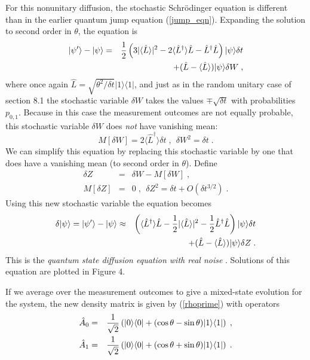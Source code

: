 \documentclass[12pt]{article}
\def\bra#1{{\langle #1 |}}
\def\ket#1{{| #1 \rangle}}
\def\expect#1{{\langle #1 \rangle}}
\def\A{{\hat A}}
\def\L{{\hat L}}
\def\Ldag{{\hat L^\dagger}}
\begin{document}
For this nonunitary diffusion, the stochastic Schr\"odinger equation
is different than in the earlier quantum jump equation (\ref{jump_eqn}).
Expanding the solution to second order in $\theta$, the equation is
\begin{eqnarray}
\ket{\psi'} - \ket\psi &=&
  {1\over2}\left(3|\expect{\L}|^2 - 2\expect{\Ldag}\L
  - \Ldag\L\right)\ket\psi \delta t \nonumber\\
&& + (\L - \expect{\L})\ket\psi \delta W \;,
\end{eqnarray}
where once again $\L = \sqrt{\theta^2/\delta t}\ket1\bra1$, and
just as in the random unitary case of section 8.1 the stochastic
variable $\delta W$ takes the values $\mp \sqrt{\delta t}$ with 
probabilities $p_{0,1}$.
Because in this case the measurement outcomes are not equally probable,
this stochastic variable $\delta W$ does {\it not} have vanishing mean:
\begin{equation}
M[\delta W] = 2\expect{\Ldag}\delta t \;, \ \ \delta W^2 = \delta t \;.
\end{equation}
We can simplify this equation by replacing this stochastic variable by
one that does have a vanishing mean (to second order in $\theta$).  Define
\begin{eqnarray}
\delta Z &=& \delta W - M[\delta W] \;, \nonumber\\
M[\delta Z] &=& 0 \;, \ \ \delta Z^2 = \delta t + O(\delta t^{3/2}) \;.
\end{eqnarray}
Using this new stochastic variable the equation becomes
\begin{eqnarray}
\delta\ket\psi = \ket{\psi'} - \ket\psi &\approx& 
  \left( \expect{\Ldag}\L - {1\over2}|\expect{\L}|^2
  - {1\over2}\Ldag\L\right)\ket\psi \delta t \nonumber\\
&& + (\L - \expect{\L})\ket\psi \delta Z \;.
\label{real_qsd}
\end{eqnarray}
This is the {\it quantum state diffusion equation with real noise}
\cite{Gisin1}.  Solutions of this equation are plotted in Figure 4.

If we average over the measurement outcomes to give a mixed-state
evolution for the system, the new density matrix is given by
(\ref{rhoprime}) with operators
\begin{eqnarray}
\A_0 &=& {1\over\sqrt2} \left( \ket0\bra0
  + (\cos\theta-\sin\theta) \ket1\bra1 \right) \;, \nonumber\\
\A_1 &=& {1\over\sqrt2} \left(  \ket0\bra0
  + (\cos\theta+\sin\theta) \ket1\bra1 \right) \;.
\label{ucnot3}
\end{eqnarray}
\end{document}
